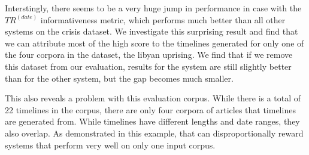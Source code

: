 \documentclass[a4paper,BCOR=10mm]{report}
\numberwithin{lemma}{chapter}
\numberwithin{definition}{chapter}
\begin{document}
Interstingly, there seems to be a very huge jump in performance in case with the $TR^{(date)}$ informativeness metric, which performs much better than all other systems on the crisis dataset. We investigate this surprising result and find that we can attribute most of the high score to the timelines generated for only one of the four corpora in the dataset, the libyan uprising.
We find that if we remove this dataset from our evaluation, results for the system are still slightly better than for the other system, but the gap becomes much smaller.

This also reveals a problem with this evaluation corpus. While there is a total of 22 timelines in the corpus, there are only four corpora of articles that timelines are generated from. While timelines have different lengths and date ranges, they also overlap. As demonstrated in this example, that can disproportionally reward systems that perform very well on only one input corpus.
\end{document}
